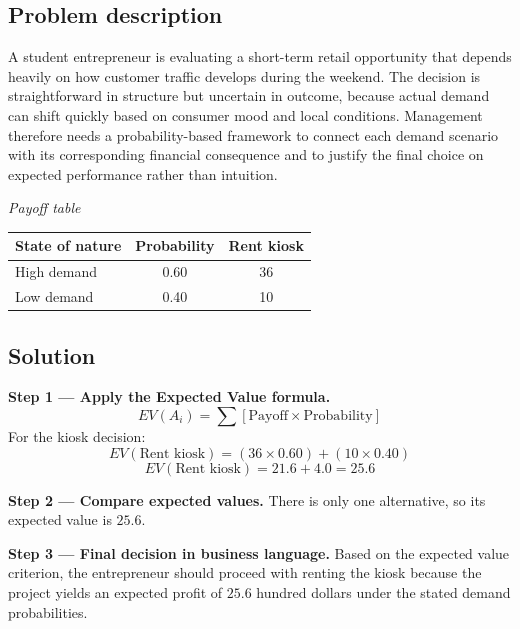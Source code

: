 

	
	\begin{ExamProblems}
		\item
		\subsection*{Problem description}
		A student entrepreneur is evaluating a short-term retail opportunity that depends heavily on how customer traffic develops during the weekend. The decision is straightforward in structure but uncertain in outcome, because actual demand can shift quickly based on consumer mood and local conditions. Management therefore needs a probability-based framework to connect each demand scenario with its corresponding financial consequence and to justify the final choice on expected performance rather than intuition.

		\begin{center}
			\textit{Payoff table} \par
			\begin{tabular}{l c c}
				\toprule
				State of nature & Probability & Rent kiosk \\
				\midrule
				High demand & 0.60 & 36 \\
				Low demand & 0.40 & 10 \\
				\bottomrule
			\end{tabular}
		\end{center}

		\subsection*{Solution}
		\textbf{Step 1 --- Apply the Expected Value formula.}
		\[
		EV(A_i)=\sum [\text{Payoff}\times\text{Probability}]
		\]
		For the kiosk decision:
		\[
		EV(\text{Rent kiosk})=(36\times0.60)+(10\times0.40)
		\]
		\[
		EV(\text{Rent kiosk})=21.6+4.0=25.6
		\]
		
		\textbf{Step 2 --- Compare expected values.}
		There is only one alternative, so its expected value is $25.6$.
		
		\textbf{Step 3 --- Final decision in business language.}
		Based on the expected value criterion, the entrepreneur should proceed with renting the kiosk because the project yields an expected profit of $25.6$ hundred dollars under the stated demand probabilities.
		

\end{ExamProblems}
